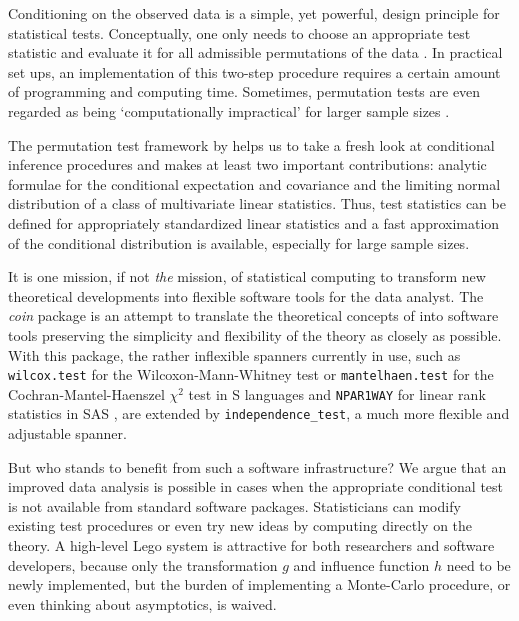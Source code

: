 \documentclass{article}
\newcommand{\Rpackage}[1]{\textit{#1}}
\newcommand{\Rcmd}[1]{\texttt{#1}}
\renewcommand{\S}{\textsf{S}}
\begin{document}
Conditioning on the observed data is a simple, yet powerful, design
principle for statistical tests. Conceptually, one only needs to choose
an appropriate test statistic and evaluate it for all admissible 
permutations of the data \citep[][gives some examples]{Ernst2004}. 
In practical set ups, an implementation of this
two-step procedure requires a certain amount of programming 
and computing time. Sometimes, permutation tests are even regarded 
as being `computationally impractical'
for larger sample sizes \citep{BalkinMallows2001}. 

The permutation test framework by \cite{StrasserWeber1999} helps us to take
a fresh look at conditional inference procedures and makes at least 
two important contributions: analytic formulae for the 
conditional expectation and covariance and the limiting normal distribution
of a class of multivariate linear statistics. Thus, test statistics can be
defined for appropriately standardized linear statistics and a fast
approximation of the conditional distribution is available, 
especially for large sample sizes. 

It is one mission, if not \textit{the} mission, of statistical computing to
transform new theoretical developments into flexible software tools for the
data analyst. The \Rpackage{coin} package is an attempt to translate 
the theoretical concepts of \cite{StrasserWeber1999} into software tools 
preserving the simplicity and flexibility of 
the theory as closely as possible. With this package, the rather inflexible spanners
currently in use,
such as \Rcmd{wilcox.test} for the Wilcoxon-Mann-Whitney test or
\Rcmd{mantelhaen.test} for the Cochran-Mantel-Haenszel $\chi^2$ test in
\S{} languages and \texttt{NPAR1WAY} for linear rank statistics in \textsf{SAS}
\citep[see the Tables in][for
an overview on procedures implemented in \textsf{StatXact}, \textsf{LogXact},
\textsf{Stata}, \textsf{SAS} and \textsf{Testimate}]{Oster2002,Oster2003}, 
are extended by \Rcmd{independence\_test}, a much more flexible and adjustable spanner.

But who stands to benefit from such a software infrastructure? We argue 
that an improved data analysis is possible in cases when the appropriate 
conditional test is not available from standard software packages.
Statisticians can modify existing test procedures or even try new ideas by
computing directly on the theory. A high-level Lego system is attractive for
both researchers and software developers, because only the transformation $g$ and influence
function $h$ need to be newly implemented, but the burden of implementing a
Monte-Carlo procedure, or even thinking about asymptotics, 
is waived. 
\end{document}
